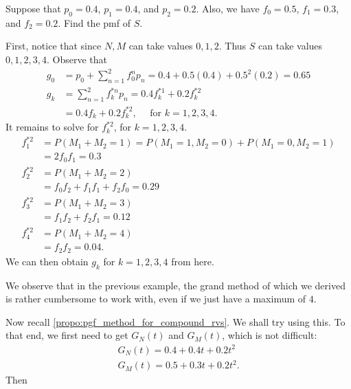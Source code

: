 \documentclass[notoc,notitlepage]{tufte-book}
\begin{document}
\begin{eg}
  Suppose that $p_0 = 0.4$, $p_1 = 0.4$, and $p_2 = 0.2$. Also, we have $f_0 = 0.5$, $f_1 = 0.3$, and $f_2 = 0.2$. Find the pmf of $S$.
\end{eg}

\begin{solution}
  First, notice that since $N, M$ can take values $0, 1, 2$. Thus $S$ can take values $0, 1, 2, 3, 4$.
  Observe that
  \begin{align*}
    g_0 &= p_0 + \sum_{n=1}^{2} f_0^n p_n = 0.4 + 0.5(0.4) + 0.5^2(0.2) = 0.65 \\
    g_k &= \sum_{n=1}^{2} f_k^{*n} p_n = 0.4 f_k^{*1} + 0.2 f_k^{*2} \\
        &= 0.4 f_k + 0.2 f_k^{*2}, \quad \text{ for } k = 1, 2, 3, 4.
  \end{align*}
  It remains to solve for $f_k^{*2}$, for $k = 1, 2, 3, 4$.
  \begin{align*}
    f_1^{*2} &= P( M_1 + M_2 = 1 ) = P(M_1 = 1, M_2 = 0) + P(M_1 = 0, M_2 = 1) \\
             &= 2f_0 f_1 = 0.3 \\
    f_2^{*2} &= P(M_1 + M_2 = 2) \\
             &= f_0 f_2 + f_1 f_1 + f_2 f_0 = 0.29 \\
    f_3^{*2} &= P(M_1 + M_2 = 3) \\
             &= f_1 f_2 + f_2 f_1 = 0.12 \\
    f_4^{*2} &= P(M_1 + M_2 = 4) \\
             &= f_2 f_2 = 0.04.
  \end{align*}
  We can then obtain $g_k$ for $k = 1, 2, 3, 4$ from here.
\end{solution}

\begin{remark}
  We observe that in the previous example, the grand method of which we derived is rather cumbersome to work with, even if we just have a maximum of $4$.
\end{remark}

Now recall \cref{propo:pgf_method_for_compound_rvs}. We shall try using this. To that end, we first need to get $G_N(t)$ and $G_M(t)$, which is not difficult:
\begin{gather*}
  G_N(t) = 0.4 + 0.4 t + 0.2 t^2 \\
  G_M(t) = 0.5 + 0.3 t + 0.2 t^2.
\end{gather*}
Then


\end{document}

